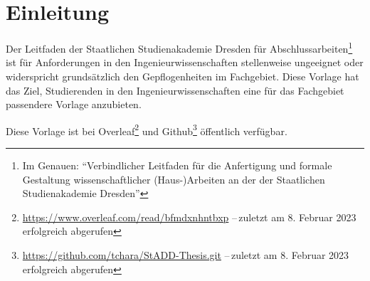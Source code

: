 \chapter{Einleitung}\label{chap:Intro}
Der Leitfaden der Staatlichen Studienakademie Dresden für Abschlussarbeiten\footnote{\label{fn:Leitfaden}Im Genauen: \enquote{Verbindlicher Leitfaden für die Anfertigung und formale Gestaltung wissenschaftlicher (Haus-)Arbeiten an der der Staatlichen Studienakademie Dresden}} ist für Anforderungen in den Ingenieurwissenschaften stellenweise ungeeignet oder widerspricht grundsätzlich den Gepflogenheiten im Fachgebiet. Diese Vorlage hat das Ziel, Studierenden in den Ingenieurwissenschaften eine für das Fachgebiet passendere Vorlage anzubieten.

Diese Vorlage ist bei Overleaf\footnote{\url{https://www.overleaf.com/read/bfmdxnhntbxp} --\,zuletzt am 8. Februar 2023 erfolgreich abgerufen} und Github\footnote{\url{https://github.com/tchara/StADD-Thesis.git} --\,zuletzt am 8. Februar 2023 erfolgreich abgerufen} öffentlich verfügbar.


